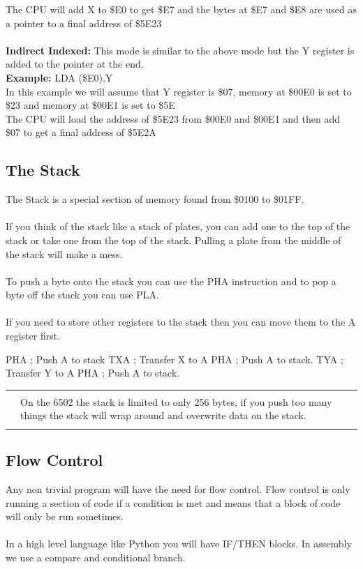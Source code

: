 \documentclass{ol-softwaremanual}
\newcommand{\Note}[1]{
\begin{table}[h]
\begin{tabular}{|p{0.1\textwidth}p{0.8\textwidth}|}
\hline
 & \\
\multicolumn{1}{|r}{\Huge\warning} & #1\\
 &  \\ \hline
\end{tabular}
\end{table}
}
\begin{document}
The CPU will add X to \$E0 to get \$E7 and the bytes at \$E7 and \$E8 are used as a pointer to a final address of \$5E23\\
\\
\textbf{Indirect Indexed:} This mode is similar to the above mode but the Y register is added to the pointer at the end.\\
\textbf{Example:} LDA (\$E0),Y\\
In this example we will assume that Y register is \$07, memory at \$00E0 is set to \$23 and memory at \$00E1 is set to \$5E\\
The CPU will load the address of \$5E23 from \$00E0 and \$00E1 and then add \$07 to get a final address of \$5E2A\\

\pagebreak

\subsection{The Stack}
The Stack is a special section of memory found from \$0100 to \$01FF.\\
\\
If you think of the stack like a stack of plates, you can add one to the top of the stack or take one from the top of the stack. Pulling a plate from the middle of the stack will make a mess.\\
\\
To push a byte onto the stack you can use the PHA instruction and to pop a byte off the stack you can use PLA.\\
\\
If you need to store other registers to the stack then you can move them to the A register first.\\
\begin{ffcode}
  PHA    ; Push A to stack
  TXA    ; Transfer X to A
  PHA    ; Push A to stack.
  TYA    ; Transfer Y to A
  PHA    ; Push A to stack.
\end{ffcode}

\Note{On the 6502 the stack is limited to only 256 bytes, if you push too many things the stack will wrap around and overwrite data on the stack.}

\pagebreak

\subsection{Flow Control}
Any non trivial program will have the need for flow control. Flow control is only running a section of code if a condition is met and means that a block of code will only be run sometimes.\\
\\
In a high level language like Python you will have IF/THEN blocks. In assembly we use a compare and conditional branch.\\
\end{document}
